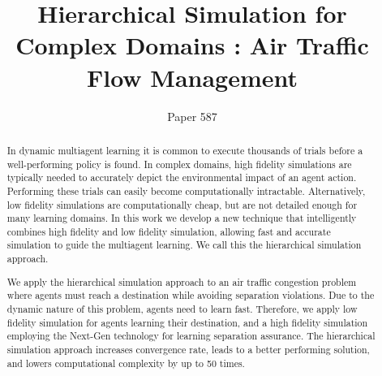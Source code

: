 \documentclass{aamas2014}
\begin{document}


\title{Hierarchical Simulation for Complex Domains : Air Traffic Flow Management}





\author{
Paper 587}



\maketitle


\begin{abstract}
In dynamic multiagent learning it is common to execute thousands of trials before a well-performing policy is found. In complex domains, high fidelity simulations are typically needed to accurately depict the environmental impact of an agent action. Performing these trials can easily become computationally intractable. Alternatively, low fidelity simulations are computationally cheap, but are not detailed enough for many learning domains. In this work we develop a new technique that intelligently combines high fidelity and low fidelity simulation, allowing fast and accurate simulation to guide the multiagent learning. We call this the hierarchical simulation approach. 

We apply the hierarchical simulation approach to an air traffic congestion problem where agents must reach a destination while avoiding separation violations. Due to the dynamic nature of this problem, agents need to learn fast. Therefore, we apply low fidelity simulation for agents learning their destination, and a high fidelity simulation employing the Next-Gen technology for learning separation assurance. The hierarchical simulation approach increases convergence rate, leads to a better performing solution, and lowers computational complexity by up to 50 times.
\end{abstract}
\end{document}
